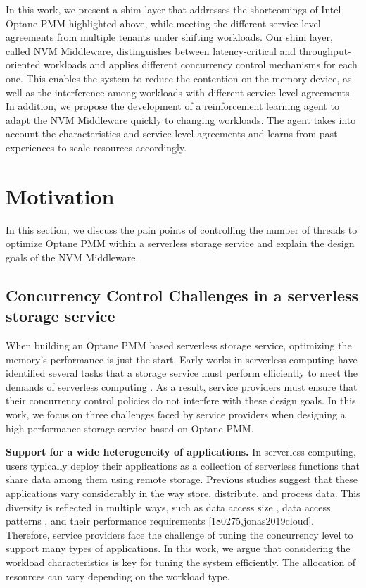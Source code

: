 In this work, we present a shim layer that addresses the shortcomings of Intel Optane PMM highlighted above, while meeting the different service level agreements from multiple tenants under shifting workloads. Our shim layer, called NVM Middleware, distinguishes between latency-critical and throughput-oriented workloads and applies different concurrency control mechanisms for each one. This enables the system to reduce the contention on the memory device, as well as the interference among workloads with different service level agreements. In addition, we propose the development of a reinforcement learning agent to adapt the NVM Middleware quickly to changing workloads. The agent takes into account the characteristics and service level agreements and learns from past experiences to scale resources accordingly.


\section{Motivation}
In this section, we discuss the pain points of controlling the number of threads to optimize Optane PMM within a serverless storage service and explain the design goals of the NVM Middleware.

\subsection{Concurrency Control Challenges in a serverless storage service}

When building an Optane PMM based serverless storage service, optimizing the memory's performance is just the start. Early works in serverless computing have identified several tasks that a storage service must perform efficiently to meet the demands of serverless computing \cite{180275,jonas2019cloud,klimovic2018understanding,klimovic2018pocket,wu2019autoscaling,romero2021faat}. As a result, service providers must ensure that their concurrency control policies do not interfere with these design goals. In this work, we focus on three challenges faced by service providers when designing a high-performance storage service based on Optane PMM.

\textbf{Support for a wide heterogeneity of applications.} In serverless computing, users typically deploy their applications as a collection of serverless functions that share data among them using remote storage. Previous studies suggest that these applications vary considerably in the way store, distribute, and process data. This diversity is reflected in multiple ways, such as data access size \cite{klimovic2018pocket,romero2021faat}, data access patterns \cite{romero2021faat}, and their performance requirements [180275,jonas2019cloud]. Therefore, service providers face the challenge of tuning the concurrency level to support many types of applications. In this work, we argue that considering the workload characteristics is key for tuning the system efficiently. The allocation of resources can vary depending on the workload type.

